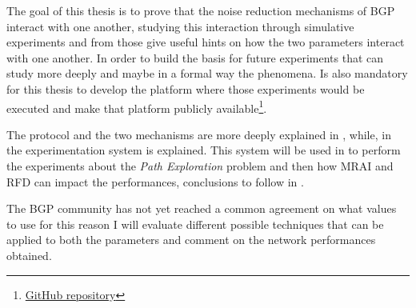 
The goal of this thesis is to prove that the noise reduction mechanisms of \ac{BGP}
interact with one another, studying this interaction through simulative experiments
and from those give useful hints on how the two parameters interact with one another.
In order to build the basis for future experiments that can study more deeply
and maybe in a formal way the phenomena.
Is also mandatory for this thesis to develop the platform where those experiments
would be executed and make that platform publicly
available\footnote{\href{https://github.com/tiamilani/BGPFSM}{GitHub repository}}.

The protocol and the two mechanisms are more deeply explained in ,
while, in  the experimentation system is explained.
This system will be used in
to perform the experiments about the \textit{Path Exploration} problem and then
how \ac{MRAI} and \ac{RFD} can impact the performances, conclusions to follow
in .

The \ac{BGP} community has not yet reached a common agreement on what values
to use for this reason I will evaluate different possible techniques that can
be applied to both the parameters and comment on the network performances obtained.

